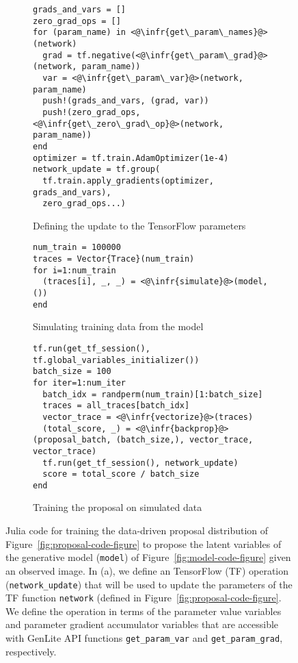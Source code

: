 \begin{figure}[t]
\begin{subfigure}[b]{0.6\textwidth}
\begin{lstlisting}
grads_and_vars = []
zero_grad_ops = []
for (param_name) in <@\infr{get\_param\_names}@>(network)
  grad = tf.negative(<@\infr{get\_param\_grad}@>(network, param_name))
  var = <@\infr{get\_param\_var}@>(network, param_name)
  push!(grads_and_vars, (grad, var))
  push!(zero_grad_ops, <@\infr{get\_zero\_grad\_op}@>(network, param_name))
end
optimizer = tf.train.AdamOptimizer(1e-4)
network_update = tf.group(
  tf.train.apply_gradients(optimizer, grads_and_vars),
  zero_grad_ops...)
\end{lstlisting}
\caption{Defining the update to the TensorFlow parameters}
\end{subfigure}%
\begin{subfigure}[b]{0.4\textwidth}
\begin{lstlisting}
num_train = 100000
traces = Vector{Trace}(num_train)
for i=1:num_train
  (traces[i], _, _) = <@\infr{simulate}@>(model, ())
end
\end{lstlisting}
\caption{Simulating training data from the model}
\end{subfigure}
\begin{subfigure}[b]{\textwidth}
\begin{lstlisting}
tf.run(get_tf_session(), tf.global_variables_initializer())
batch_size = 100
for iter=1:num_iter
  batch_idx = randperm(num_train)[1:batch_size]
  traces = all_traces[batch_idx]
  vector_trace = <@\infr{vectorize}@>(traces)
  (total_score, _) = <@\infr{backprop}@>(proposal_batch, (batch_size,), vector_trace, vector_trace)
  tf.run(get_tf_session(), network_update)
  score = total_score / batch_size
end
\end{lstlisting}
\caption{Training the proposal on simulated data}
\end{subfigure}
\caption{
Julia code for training the data-driven proposal distribution of Figure~\ref{fig:proposal-code-figure} to propose the latent variables of the generative model (\texttt{model}) of Figure~\ref{fig:model-code-figure} given an observed image.
In (a), we define an TensorFlow (TF) operation (\texttt{network\_update}) that will be used to update the parameters of the TF function \texttt{network} (defined in Figure~\ref{fig:proposal-code-figure}.
We define the operation in terms of the parameter value variables and parameter gradient accumulator variables that are accessible with GenLite API functions \texttt{get\_param\_var} and \texttt{get\_param\_grad}, respectively.
}
\end{figure}
